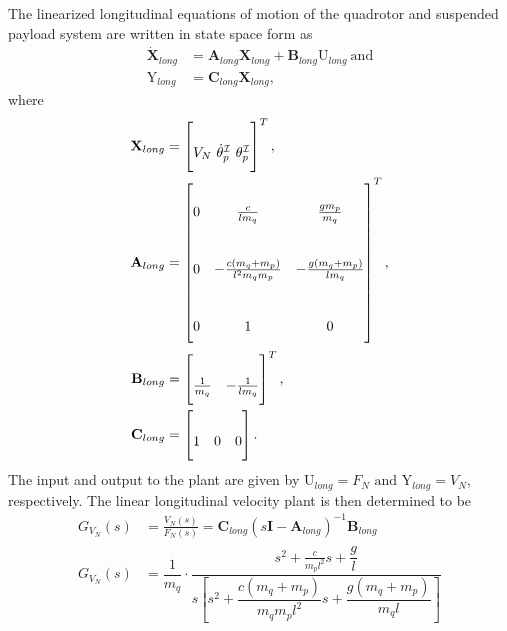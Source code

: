 
        The linearized longitudinal equations of motion of the quadrotor and suspended payload system are written in state space form as 
        \begin{align}
        \dot{\textbf{X}}_{long} &= \textbf{A}_{long} \textbf{X}_{long} + \textbf{B}_{long} \mbox{U}_{long}~\mbox{and}\\
        \mbox{Y}_{long} &= \textbf{C}_{long} \textbf{X}_{long},
        \end{align}
        where 
        \begin{align}
        \renewcommand\arraystretch{3}
        \textbf{X}_{long} & = 
        \begin{bmatrix}
        V_N~\dot{\theta}_p^\mathcal{I}~\theta_p^\mathcal{I}
        \end{bmatrix}^T,\\
        \textbf{A}_{long} &= 
        \begin{bmatrix}
        0 & \frac{c}{l m_q} & \frac{g m_p}{m_q}\\[0.5em]
        0 & -\frac{c(m_q + m_p)}{l^2 m_q m_p} & -\frac{g(m_q + m_p)}{l m_q} \\[0.5em]
        0 & 1 & 0
        \end{bmatrix}^T,\\
        \textbf{B}_{long}& = 
        \begin{bmatrix}
        \frac{1}{m_q} & -\frac{1}{l m_q}
        \end{bmatrix}^T, \\
        \textbf{C}_{long} &= 
        \begin{bmatrix}
        1 & 0 & 0
        \end{bmatrix}.%
        \end{align}
        The input and output to the plant are given by $\mbox{U}_{long} = F_N  \mbox{ and } \mbox{Y}_{long} = V_N$, respectively. The linear longitudinal velocity plant is then determined to be 
        \begin{align}\label{eq:lin_vel_quad_pl}
        G_{V_N}(s) &= \frac{V_N(s)}{F_N(s)} = \textbf{C}_{long} \left(s \textbf{I} - \textbf{A}_{long}\right)^{-1} \textbf{B}_{long} \\
        G_{V_N}(s) &= \dfrac{1}{m_q} \cdot \dfrac{s^2 + \frac{c}{m_p l^2}s + \dfrac{g}{l}}{s \left[s^2 + \dfrac{c(m_q + m_p)}{m_q m_p l^2}s + \dfrac{g(m_q + m_p)}{m_q l}\right]} 
        \end{align}
